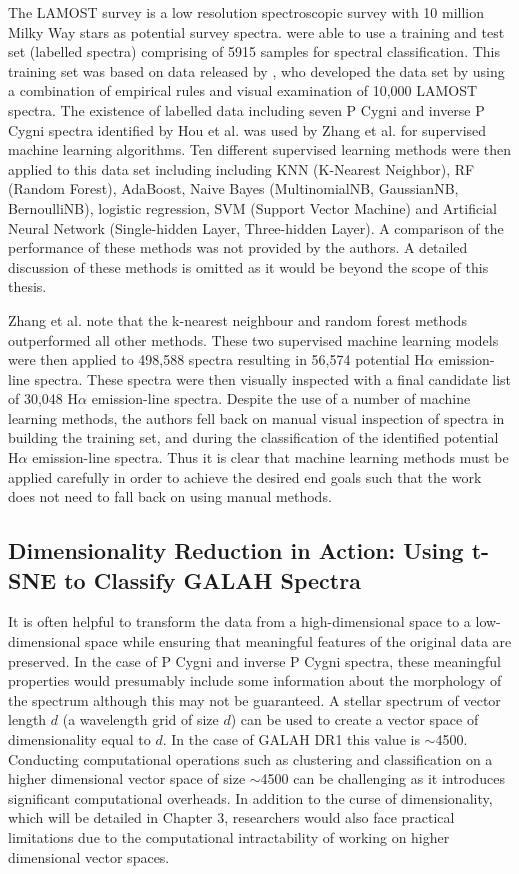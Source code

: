 The LAMOST survey is a low resolution spectroscopic survey with 10 million Milky Way stars as potential survey spectra. \citet{zhang2021catalog} were able to use a training and test set (labelled spectra) comprising of 5915 samples for spectral classification. This training set was based on data released by \citet{hou2016catalog}, who developed the data set by using a combination of empirical rules and visual examination of 10,000 LAMOST spectra. The existence of labelled data including seven P Cygni and inverse P Cygni spectra identified by Hou et al. was used by Zhang et al. for supervised machine learning algorithms. Ten different supervised learning methods were then applied to this data set including including KNN (K-Nearest Neighbor), RF (Random Forest), AdaBoost, Naive Bayes (MultinomialNB, GaussianNB, BernoulliNB), logistic regression, SVM (Support Vector Machine) and Artificial Neural Network (Single-hidden Layer, Three-hidden Layer). A comparison of the performance of these methods was not provided by the authors. A detailed discussion of these methods is omitted as it would be beyond the scope of this thesis. 

Zhang et al. note that the k-nearest neighbour and random forest methods outperformed all other methods. These two supervised machine learning models were then applied to 498,588 spectra resulting in 56,574 potential H$\alpha$ emission-line spectra. These spectra were then visually inspected with a final candidate list of 30,048 H$\alpha$ emission-line spectra. Despite the use of a number of machine learning methods, the authors fell back on manual visual inspection of spectra in building the training set, and during the classification of the identified potential H$\alpha$ emission-line spectra. Thus it is clear that machine learning methods must be applied carefully in order to achieve the desired end goals such that the work does not need to fall back on using manual methods.

\subsection{Dimensionality Reduction in Action: Using t-SNE to Classify GALAH Spectra}

It is often helpful to transform the data from a high-dimensional space to a low-dimensional space while ensuring that meaningful features of the original data are preserved. In the case of P Cygni and inverse P Cygni spectra, these meaningful properties would presumably include some information about the morphology of the spectrum although this may not be guaranteed. A stellar spectrum of vector length $d$ (a wavelength grid of size $d$) can be used to create a vector space of dimensionality equal to $d$. In the case of GALAH DR1 this value is $\sim$4500. Conducting computational operations such as clustering and classification on a higher dimensional vector space of size $\sim$4500 can be challenging as it introduces significant computational overheads. In addition to the curse of dimensionality, which will be detailed in Chapter 3, researchers would also face practical limitations due to the computational intractability of working on higher dimensional vector spaces.

